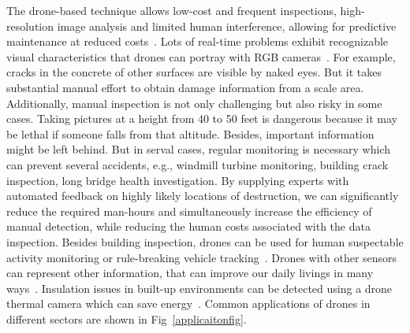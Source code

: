 The drone-based technique allows low-cost and frequent inspections, high-resolution image analysis and limited human interference, allowing for predictive maintenance at reduced costs~\cite{morgenthal2014quality}. Lots of real-time problems exhibit recognizable visual characteristics that drones can portray with RGB cameras~\cite{roy2013performance}. For example, cracks in the concrete of other surfaces are visible by naked eyes. But it takes substantial manual effort to obtain damage information from a scale area. Additionally, manual inspection is not only challenging but also risky in some cases. Taking pictures at a height from 40 to 50 feet is dangerous because it may be lethal if someone falls from that altitude. Besides, important information might be left behind. But in serval cases, regular monitoring is necessary which can prevent several accidents, e.g., windmill turbine monitoring, building crack inspection, long bridge health investigation. By supplying experts with automated feedback on highly likely locations of destruction, we can significantly reduce the required man-hours and simultaneously increase the efficiency of manual detection, while reducing the human costs associated with the data inspection. Besides building inspection, drones can be used for human suspectable activity monitoring or rule-breaking vehicle tracking~\cite{ngo2019isir}. Drones with other sensors can represent other information, that can improve our daily livings in many ways~\cite{roy2015aarpa, pathak2015acoustic}. Insulation issues in built-up environments can be detected using a drone thermal camera which can save energy~\cite{khan2019detecting, khan2015demo, khan2020temporal}. Common applications of drones in different sectors are shown in Fig~\ref{applicaitonfig}.


